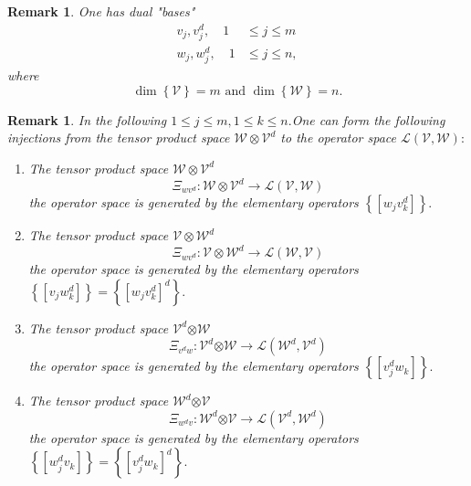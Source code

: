 \documentclass[aps,preprint]{revtex4}%
\newtheorem{remark}[theorem]{Remark}
\begin{document}
\begin{remark}
One has dual "bases"
\begin{align}
v_{j},v_{j}^{d},\quad1  &  \leq j\leq m\\
w_{j},w_{j}^{d},\quad1  &  \leq j\leq n,
\end{align}
where
\begin{equation}
\dim\left\{  \mathcal{V}\right\}  =m\text{ and }\dim\left\{  \mathcal{W}%
\right\}  =n.
\end{equation}

\end{remark}

\begin{remark}
In the following $1\leq j\leq m,1\leq k\leq n.$One can form the
\emph{following injections from the tensor product space} $\mathcal{W\otimes
V}^{d}$ to the operator space $\mathcal{L}\left(  \mathcal{V},\mathcal{W}%
\right)  :$

\begin{enumerate}
\item The tensor product space $\mathcal{W\otimes V}^{d}$
\begin{equation}
\Xi_{wv^{d}}:\mathcal{W\otimes V}^{d}\rightarrow\mathcal{L}\left(
\mathcal{V},\mathcal{W}\right)
\end{equation}
the operator space is generated by the elementary operators $\left\{  \left[
w_{j}v_{k}^{d}\right]  \right\}  .$

\item The tensor product space $\mathcal{V\otimes W}^{d}$
\begin{equation}
\Xi_{wv^{d}}:\mathcal{V\otimes W}^{d}\rightarrow\mathcal{L}\left(
\mathcal{W},\mathcal{V}\right)
\end{equation}
the operator space is generated by the elementary operators $\left\{  \left[
v_{j}w_{k}^{d}\right]  \right\}  =\left\{  \left[  w_{j}v_{k}^{d}\right]
^{d}\right\}  .$

\item The tensor product space $\mathcal{V}^{d}\mathcal{\otimes W}$%
\begin{equation}
\Xi_{v^{d}w}:\mathcal{V}^{d}\mathcal{\otimes W}\rightarrow\mathcal{L}\left(
\mathcal{W}^{d},\mathcal{V}^{d}\right)
\end{equation}
the operator space is generated by the elementary operators $\left\{  \left[
v_{j}^{d}w_{k}\right]  \right\}  .$

\item The tensor product space $\mathcal{W}^{d}\mathcal{\otimes V}$%
\begin{equation}
\Xi_{w^{d}v}:\mathcal{W}^{d}\mathcal{\otimes V}\rightarrow\mathcal{L}\left(
\mathcal{V}^{d},\mathcal{W}^{d}\right)
\end{equation}
the operator space is generated by the elementary operators $\left\{  \left[
w_{j}^{d}v_{k}\right]  \right\}  =\left\{  \left[  v_{j}^{d}w_{k}\right]
^{d}\right\}  .$


\end{enumerate}
\end{remark}
\end{document}
